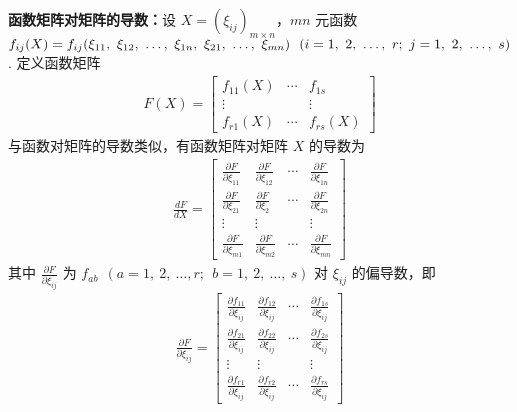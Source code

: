             \par \textbf{函数矩阵对矩阵的导数：}设 $X = (\xi_{ij})_{m \times n}$，$mn$ 元函数 $f_{ij}(X) = f_{ij}(\xi_{11}, \ \xi_{12}, \ \dots, \\ \ \xi_{1n}, \ \xi_{21}, \ \dots, \ \xi_{mn}) \ \ (i = 1, \ 2, \ \dots, \ r; \ j = 1, \ 2, \ \dots, \ s)$. 定义函数矩阵
            \begin{align*}
                F(X) = \begin{bmatrix}
                    f_{11}(X) & \cdots & f_{1s} \\ \vdots & & \vdots \\ f_{r1}(X) & \cdots & f_{rs}(X)
                \end{bmatrix}
            \end{align*}
            与函数对矩阵的导数类似，有函数矩阵对矩阵 $X$ 的导数为
            \begin{align*}
                \frac{dF}{dX} = \begin{bmatrix}
                    \frac{\partial F}{\partial \xi_{11}} & \frac{\partial F}{\partial \xi_{12}} & \cdots & \frac{\partial F}{\partial \xi_{1n}} \\ \frac{\partial F}{\partial \xi_{21}} & \frac{\partial F}{\partial \xi_{2}} & \cdots & \frac{\partial F}{\partial \xi_{2n}} \\ \vdots & \vdots & & \vdots \\ \frac{\partial F}{\partial \xi_{m1}} & \frac{\partial F}{\partial \xi_{m2}} & \cdots & \frac{\partial F}{\partial \xi_{mn}}
                \end{bmatrix}
            \end{align*}
            其中 $\frac{\partial F}{\partial \xi_{ij}}$ 为 $f_{ab} \ \ (a = 1, \ 2, \ \dots, r; \ \ b = 1, \ 2, \ \dots, \ s)$ 对 $\xi_{ij}$ 的偏导数，即
            \begin{align*}
                \frac{\partial F}{\partial \xi_{ij}} = \begin{bmatrix}
                    \frac{\partial f_{11}}{\partial \xi_{ij}} & \frac{\partial f_{12}}{\partial \xi_{ij}} & \cdots & \frac{\partial f_{1s}}{\partial \xi_{ij}} \\ \frac{\partial f_{21}}{\partial \xi_{ij}} & \frac{\partial f_{22}}{\partial \xi_{ij}} & \cdots & \frac{\partial f_{2s}}{\partial \xi_{ij}} \\ \vdots & \vdots & & \vdots \\ \frac{\partial f_{r1}}{\partial \xi_{ij}} & \frac{\partial f_{r2}}{\partial \xi_{ij}} & \cdots & \frac{\partial f_{rs}}{\partial \xi_{ij}}
                \end{bmatrix}
            \end{align*}

            